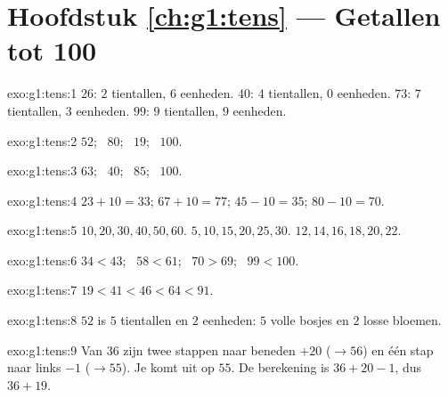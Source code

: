 \section*{Hoofdstuk \ref{ch:g1:tens} --- Getallen tot 100}

\begin{solution}{exo:g1:tens:1}
$26$: $2$ tientallen, $6$ eenheden. $40$: $4$ tientallen, $0$
eenheden. $73$: $7$ tientallen, $3$ eenheden. $99$: $9$ tientallen,
$9$ eenheden.
\end{solution}

\begin{solution}{exo:g1:tens:2}
$52$; \ $80$; \ $19$; \ $100$.
\end{solution}

\begin{solution}{exo:g1:tens:3}
$63$; \ $40$; \ $85$; \ $100$.
\end{solution}

\begin{solution}{exo:g1:tens:4}
$23 + 10 = 33$; \quad $67 + 10 = 77$; \quad $45 - 10 = 35$; \quad
$80 - 10 = 70$.
\end{solution}

\begin{solution}{exo:g1:tens:5}
$10, 20, 30, 40, 50, 60$. \quad $5, 10, 15, 20, 25, 30$. \quad
$12, 14, 16, 18, 20, 22$.
\end{solution}

\begin{solution}{exo:g1:tens:6}
$34 < 43$; \ $58 < 61$; \ $70 > 69$; \ $99 < 100$.
\end{solution}

\begin{solution}{exo:g1:tens:7}
$19 < 41 < 46 < 64 < 91$.
\end{solution}

\begin{solution}{exo:g1:tens:8}
$52$ is $5$ tientallen en $2$ eenheden: $5$ volle bosjes en $2$ losse
bloemen.
\end{solution}

\begin{solution}{exo:g1:tens:9}
Van $36$ zijn twee stappen naar beneden $+20$ ($\to 56$) en één stap
naar links $-1$ ($\to 55$). Je komt uit op $55$. De berekening is
$36 + 20 - 1$, dus $36 + 19$.
\end{solution}
